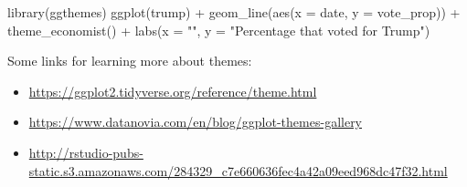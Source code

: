 \documentclass[
]{article}
\newenvironment{Shaded}{\begin{snugshade}}{\end{snugshade}}
\newcommand{\AttributeTok}[1]{\textcolor[rgb]{0.77,0.63,0.00}{#1}}
\newcommand{\FunctionTok}[1]{\textcolor[rgb]{0.00,0.00,0.00}{#1}}
\newcommand{\NormalTok}[1]{#1}
\newcommand{\SpecialCharTok}[1]{\textcolor[rgb]{0.00,0.00,0.00}{#1}}
\newcommand{\StringTok}[1]{\textcolor[rgb]{0.31,0.60,0.02}{#1}}
\providecommand{\tightlist}{%
  \setlength{\itemsep}{0pt}\setlength{\parskip}{0pt}}
\begin{document}
\begin{Shaded}
\begin{Highlighting}[]
\FunctionTok{library}\NormalTok{(ggthemes)}
\FunctionTok{ggplot}\NormalTok{(trump) }\SpecialCharTok{+} 
  \FunctionTok{geom\_line}\NormalTok{(}\FunctionTok{aes}\NormalTok{(}\AttributeTok{x =}\NormalTok{ date, }\AttributeTok{y =}\NormalTok{ vote\_prop)) }\SpecialCharTok{+} 
  \FunctionTok{theme\_economist}\NormalTok{() }\SpecialCharTok{+}
  \FunctionTok{labs}\NormalTok{(}\AttributeTok{x =} \StringTok{""}\NormalTok{, }\AttributeTok{y =} \StringTok{"Percentage that voted for Trump"}\NormalTok{)}
\end{Highlighting}
\end{Shaded}

Some links for learning more about themes:

\begin{itemize}
\tightlist
\item
  \url{https://ggplot2.tidyverse.org/reference/theme.html}
\item
  \url{https://www.datanovia.com/en/blog/ggplot-themes-gallery}
\item
  \url{http://rstudio-pubs-static.s3.amazonaws.com/284329_c7e660636fec4a42a09eed968dc47f32.html}
\end{itemize}
\end{document}
